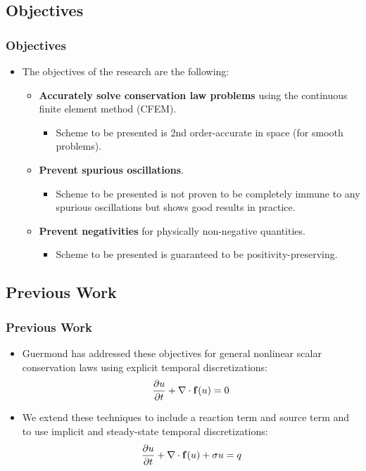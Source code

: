 \documentclass{beamer}
\begin{document}
\subsection{Objectives}
\begin{frame}
\frametitle{Objectives}

\begin{itemize}
   \item The objectives of the research are the following:
   \begin{itemize}
      \item \textbf{Accurately solve conservation law problems} using the
         continuous finite element method (CFEM).
      \begin{itemize}
         \item Scheme to be presented is 2nd order-accurate in space (for smooth
            problems).
      \end{itemize}
      \item \textbf{Prevent spurious oscillations}.
      \begin{itemize}
	 \item Scheme to be presented is not proven to be completely immune to any
            spurious oscillations but shows good results in practice.
      \end{itemize}
      \item \textbf{Prevent negativities} for physically non-negative quantities.
      \begin{itemize}
         \item Scheme to be presented is guaranteed to be positivity-preserving.
      \end{itemize}
   \end{itemize}
\end{itemize}

\end{frame}
\subsection{Previous Work}
\begin{frame}
\frametitle{Previous Work}

\begin{itemize}
  \item Guermond has addressed these objectives for general nonlinear scalar
    conservation laws using explicit temporal discretizations:
    \[
      \frac{\partial u}{\partial t} + \nabla\cdot\mathbf{f}(u) = 0
    \]
  \item We extend these techniques to include a reaction term and source term
    and to use implicit and steady-state temporal discretizations:
    \[
      \frac{\partial u}{\partial t} + \nabla\cdot\mathbf{f}(u) + \sigma u = q
    \]
\end{itemize}

\end{frame}
\end{document}
